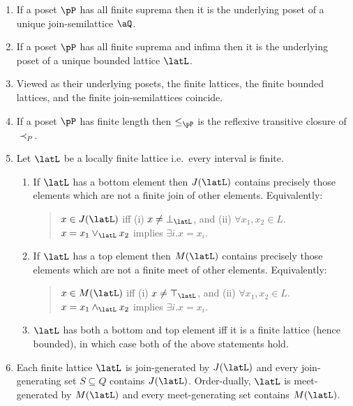 \documentclass{article}
\begin{document}
\begin{lemma}
\label{lem:std_order_theory}
\item
\begin{enumerate}
\item
If a poset $\pP$ has all finite suprema then it is the underlying poset of a unique join-semilattice $\aQ$.
\item
If a poset $\pP$ has all finite suprema and infima then it is the underlying poset of a unique bounded lattice $\latL$.
\item
Viewed as their underlying posets, the finite lattices, the finite bounded lattices, and the finite join-semilattices coincide.

\item
If a poset $\pP$ has finite length then $\leq_\pP$ is the reflexive transitive closure of $\prec_P$.


\item
Let $\latL$ be a locally finite lattice i.e.\ every interval is finite.
\begin{enumerate}
\item
If $\latL$ has a bottom element then $J(\latL)$ contains precisely those elements which are not a finite join of other elements. Equivalently:
\begin{quote} 
$x \in J(\latL)$ iff (i) $x \neq \bot_\latL$, and (ii) $\forall x_1,x_2 \in L$. $x = x_1 \lor_\latL x_2$ implies $\exists i. x = x_i$.
\end{quote}

\item
If $\latL$ has a top element then $M(\latL)$ contains precisely those elements which are not a finite meet of other elements. Equivalently:
\begin{quote} 
$x \in M(\latL)$ iff (i) $x \neq \top_\latL$, and (ii) $\forall x_1,x_2 \in L$. $x = x_1 \land_\latL x_2$ implies $\exists i. x = x_i$.
\end{quote}

\item
$\latL$ has both a bottom and top element iff it is a finite lattice (hence bounded), in which case both of the above statements hold.
\end{enumerate}

\item
Each finite lattice $\latL$ is join-generated by $J(\latL)$ and every join-generating set $S \subseteq Q$ contains $J(\latL)$. Order-dually, $\latL$ is meet-generated by $M(\latL)$ and every meet-generating set contains $M(\latL)$.


\end{enumerate}
\end{lemma}
\end{document}

